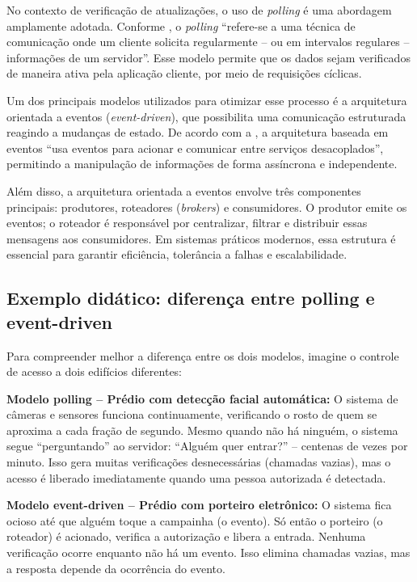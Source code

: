 \documentclass[
    12pt
    ,oneside
    ,a4paper
    ,chapter=TITLE
    ,section=TITLE
    ,sumario=abnt-6027-2012]{abntex2}
\begin{document}
No contexto de verificação de atualizações, o uso de \textit{polling} é uma abordagem amplamente adotada. Conforme , o \textit{polling} “refere-se a uma técnica de comunicação onde um cliente solicita regularmente – ou em intervalos regulares – informações de um servidor”. Esse modelo permite que os dados sejam verificados de maneira ativa pela aplicação cliente, por meio de requisições cíclicas.

Um dos principais modelos utilizados para otimizar esse processo é a arquitetura orientada a eventos (\textit{event-driven}), que possibilita uma comunicação estruturada reagindo a mudanças de estado. De acordo com a , a arquitetura baseada em eventos “usa eventos para acionar e comunicar entre serviços desacoplados”, permitindo a manipulação de informações de forma assíncrona e independente.

Além disso, a arquitetura orientada a eventos envolve três componentes principais: produtores, roteadores (\textit{brokers}) e consumidores. O produtor emite os eventos; o roteador é responsável por centralizar, filtrar e distribuir essas mensagens aos consumidores. Em sistemas práticos modernos, essa estrutura é essencial para garantir eficiência, tolerância a falhas e escalabilidade.

\subsection{Exemplo didático: diferença entre polling e event-driven}

Para compreender melhor a diferença entre os dois modelos, imagine o controle de acesso a dois edifícios diferentes:

\textbf{Modelo polling – Prédio com detecção facial automática:} O sistema de câmeras e sensores funciona continuamente, verificando o rosto de quem se aproxima a cada fração de segundo. Mesmo quando não há ninguém, o sistema segue “perguntando” ao servidor: “Alguém quer entrar?” – centenas de vezes por minuto. Isso gera muitas verificações desnecessárias (chamadas vazias), mas o acesso é liberado imediatamente quando uma pessoa autorizada é detectada.

\textbf{Modelo event-driven – Prédio com porteiro eletrônico:} O sistema fica ocioso até que alguém toque a campainha (o evento). Só então o porteiro (o roteador) é acionado, verifica a autorização e libera a entrada. Nenhuma verificação ocorre enquanto não há um evento. Isso elimina chamadas vazias, mas a resposta depende da ocorrência do evento.
\end{document}

